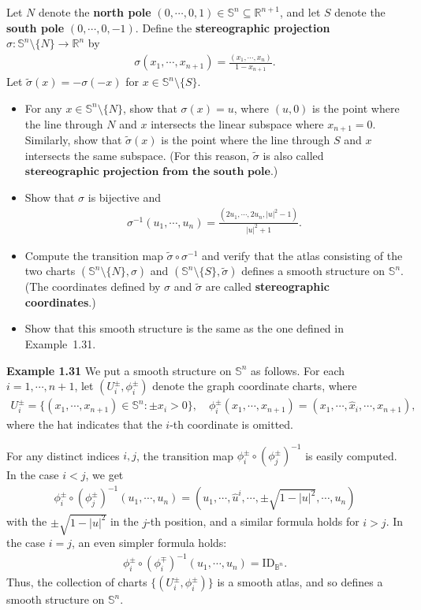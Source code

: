 Let $N$ denote the \textbf{north pole} $(0,\cdots,0,1)\in \mathbb{S}^n\subseteq \mathbb{R}^{n+1}$, and let $S$ denote the \textbf{south pole} $(0,\cdots,0,-1)$. Define the \textbf{stereographic projection} $\sigma:\mathbb{S}^n\setminus \{N\}\to \mathbb{R}^n$ by
\begin{align}
    \sigma(x_1,\cdots,x_{n+1})=\frac{(x_1,\cdots,x_n)}{1-x_{n+1}}.
\end{align}
Let $\tilde{\sigma}(x)=-\sigma(-x)$ for $x\in \mathbb{S}^n\setminus \{S\}$. 
\begin{itemize}
    \item [(a)] For any $x\in \mathbb{S}^n\setminus \{N\}$, show that $\sigma(x)=u$, where $(u,0)$ is the point where the line through $N$ and $x$ intersects the linear subspace where $x_{n+1}=0$. Similarly, show that $\tilde{\sigma}(x)$ is the point where the line through $S$ and $x$ intersects the same subspace. (For this reason, $\tilde{\sigma}$ is also called $\textbf{stereographic projection from the south pole}$.)  
    \item [(b)] Show that $\sigma$ is bijective and 
    \begin{align}
        \sigma^{-1}(u_1,\cdots,u_n)=\frac{(2u_1,\cdots,2u_n, |u|^2-1)}{|u|^2+1}.
    \end{align}
    \item [(c)] Compute the transition map $\tilde{\sigma}\circ \sigma^{-1}$ and verify that the atlas consisting of the two charts $(\mathbb{S}^n\setminus \{N\},\sigma)$ and $(\mathbb{S}^n\setminus \{S\},\tilde{\sigma})$ defines a smooth structure on $\mathbb{S}^n$. (The coordinates defined by $\sigma$ and $\tilde{\sigma}$ are called \textbf{stereographic coordinates}.)
    \item [(d)] Show that this smooth structure is the same as the one defined in Example~1.31.
\end{itemize}

\textbf{Example 1.31} We put a smooth structure on $\mathbb{S}^n$ as follows. For each $i=1,\cdots,n+1$, let $(U_i^\pm,\phi_i^\pm)$ denote the graph coordinate charts, where 
\begin{align}
    U_i^\pm=\{(x_1,\cdots,x_{n+1})\in \mathbb{S}^n: \pm x_i>0\},\quad \phi_i^\pm(x_1,\cdots,x_{n+1})=(x_1,\cdots,\hat{x}_i,\cdots,x_{n+1}),
\end{align}
where the hat indicates that the $i$-th coordinate is omitted. 


For any distinct indices $i,j$, the transition map $\phi_i^\pm\circ (\phi_j^\pm)^{-1}$ is easily computed. In the case $i<j$, we get 
\begin{align}
    \phi_i^\pm\circ (\phi_j^\pm)^{-1}(u_1,\cdots,u_{n})=(u_1,\cdots,\hat{u}^{i},\cdots,\pm\sqrt{1-|u|^2},\cdots,u_{n})
\end{align}
with the $\pm\sqrt{1-|u|^2}$ in the $j$-th position, and a similar formula holds for $i>j$. In the case $i=j$, an even simpler formula holds:
\begin{align}
    \phi_i^\pm\circ (\phi_i^\mp)^{-1}(u_1,\cdots,u_{n})=\mathrm{ID}_{\mathbb{B}^n}.
\end{align}
Thus, the collection of charts $\{(U_i^\pm,\phi_i^\pm)\}$ is a smooth atlas, and so defines a smooth structure on $\mathbb{S}^n$.

